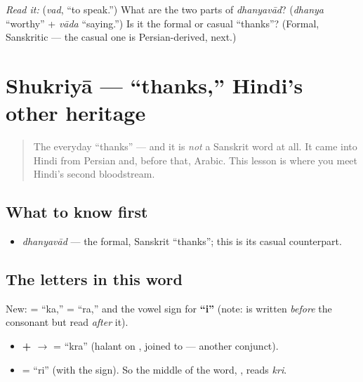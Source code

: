 \begin{tcolorbox}[breakable,colback=teal!4,colframe=teal!35!black,title={Before you move on}]
\emph{Read it:} \textbf{} (\emph{vad}, \textquotedblleft{}to speak.\textquotedblright{}) What are the two parts of \emph{dhanyavād}? (\emph{dhanya} \textquotedblleft{}worthy\textquotedblright{} + \emph{vāda} \textquotedblleft{}saying.\textquotedblright{}) Is it the formal or casual \textquotedblleft{}thanks\textquotedblright{}? (Formal, Sanskritic — the casual one is Persian-derived, next.)
\end{tcolorbox}
\section[\texorpdfstring{\hi{शुक्रिया} (shukriyā)}{शुक्रिया (shukriyā)}]{Shukriyā — \textquotedblleft{}thanks,\textquotedblright{} Hindi's other heritage}

\label{lesson:HI-C01-shukriya}



\begin{quote}
The everyday \textquotedblleft{}thanks\textquotedblright{} — and it is \emph{not} a Sanskrit word at all. It came into Hindi from Persian and, before that, Arabic. This lesson is where you meet Hindi's second bloodstream.
\end{quote}

\subsection*{What to know first}
\begin{itemize}
\raggedright
  \item \emph{dhanyavād} — the formal, Sanskrit \textquotedblleft{}thanks\textquotedblright{}; this is its casual counterpart.
\end{itemize}

\subsection*{The letters in this word}
New: \textbf{} = \textquotedblleft{}ka,\textquotedblright{} \textbf{} = \textquotedblleft{}ra,\textquotedblright{} and the vowel sign \textbf{} for \textbf{\textquotedblleft{}i\textquotedblright{}} (note: \textbf{} is written \emph{before} the consonant but read \emph{after} it).

\begin{itemize}
\raggedright
  \item \textbf{ +  $\to$ } = \textquotedblleft{}kra\textquotedblright{} (halant on , joined to  — another conjunct).
  \item \textbf{} = \textquotedblleft{}ri\textquotedblright{} (with the \textbf{} sign). So the middle of the word, \textbf{}, reads \emph{kri}.
\end{itemize}

